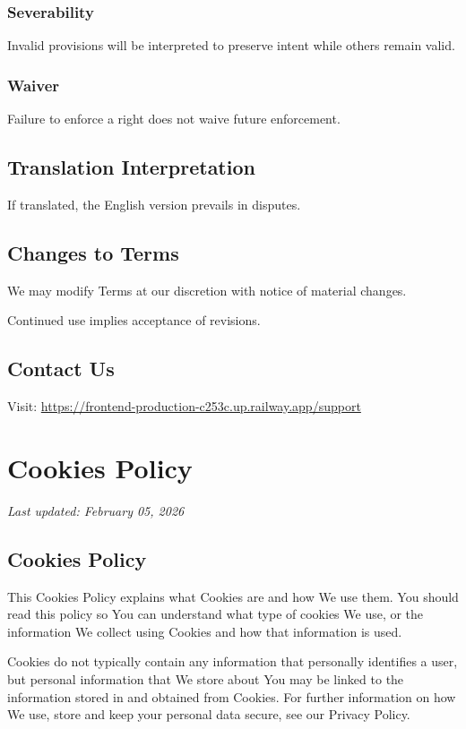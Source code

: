 \documentclass[11pt, a4paper]{report}
\begin{document}
\begin{itemize}
\subsection*{Severability}
Invalid provisions will be interpreted to preserve intent while others remain valid.

\subsection*{Waiver}
Failure to enforce a right does not waive future enforcement.

\section*{Translation Interpretation}
If translated, the English version prevails in disputes.

\section*{Changes to Terms}
We may modify Terms at our discretion with notice of material changes.

Continued use implies acceptance of revisions.

\section*{Contact Us}
Visit: \url{https://frontend-production-c253c.up.railway.app/support}

\chapter{Cookies Policy}
\textit{Last updated: February 05, 2026}
\bigskip

\section*{Cookies Policy}
This Cookies Policy explains what Cookies are and how We use them. You should read this policy so You can understand what type of cookies We use, or the information We collect using Cookies and how that information is used.

Cookies do not typically contain any information that personally identifies a user, but personal information that We store about You may be linked to the information stored in and obtained from Cookies. For further information on how We use, store and keep your personal data secure, see our Privacy Policy.


\end{itemize}
\end{document}
